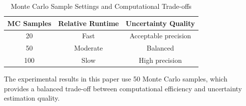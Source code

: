 \begin{table}[htbp]
\centering
\caption{Monte Carlo Sample Settings and Computational Trade-offs}
\label{table:mc_sensitivity}
\begin{tabular}{ccc}
\toprule
\textbf{MC Samples} & \textbf{Relative Runtime} & \textbf{Uncertainty Quality} \\
\midrule
20 & Fast & Acceptable precision \\
50 & Moderate & Balanced \\
100 & Slow & High precision \\
\bottomrule
\end{tabular}
\begin{flushleft}
\footnotesize The experimental results in this paper use 50 Monte Carlo samples, which provides a balanced trade-off between computational efficiency and uncertainty estimation quality.
\end{flushleft}
\end{table}
